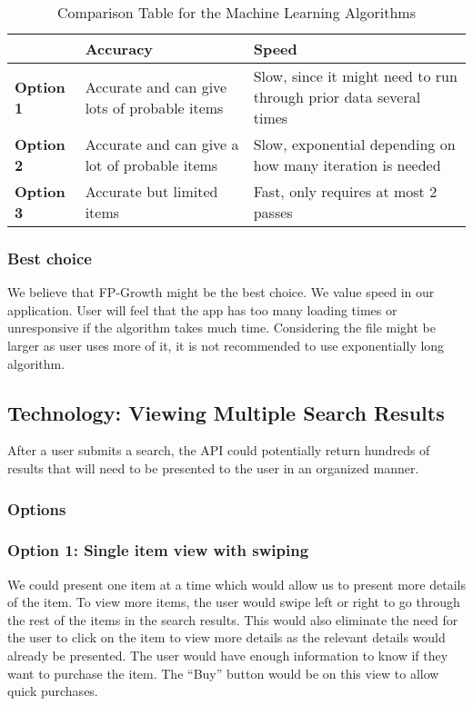 \documentclass[journal,compsoc, 10pt, draftclsnofoot, onecolumn]{IEEEtran}
\begin{document}
\begin{table}[h]
	\centering
	\caption{Comparison Table for the Machine Learning Algorithms}
	\label{Comparison Table for the Machine Learning Algorithms}
	\begin{tabularx}{\textwidth}{|X|X|X|}
		\hline
		\textbf{}         & \textbf{Accuracy}                & \textbf{Speed} 
		\\ \hline
\textbf{Option 1} & Accurate and can give lots of probable items & Slow, since it
might need to run through prior data several times
		\\ \hline
\textbf{Option 2} & Accurate and can give a lot of probable items & Slow, exponential
depending on how many iteration is needed
		\\ \hline
\textbf{Option 3} & Accurate but limited items & Fast, only requires at most 2 passes		\\ \hline
	\end{tabularx}
\end{table}

\subsubsection{Best choice}
We believe that FP-Growth might be the best choice. We value speed in our
application. User will feel that the app has too many loading times or unresponsive
if the algorithm takes much time. Considering the file might be larger as user uses
more of it, it is not recommended to use exponentially long algorithm.

\subsection{Technology: Viewing Multiple Search Results}
After a user submits a search, the API could potentially return hundreds of results
that will need to be presented to the user in an organized manner.

\subsubsection{Options}
\subsubsection*{Option 1: Single item view with swiping}
We could present one item at a time which would allow us to present more details of
the item. To view more items, the user would swipe left or right to go through the 
rest of the items in the search results. This would also eliminate the need for the 
user to click on the item to view more details as the relevant details would already 
be presented. The user would have enough information to know if they want to 
purchase the item. The ``Buy'' button would be on this view to allow quick purchases. 
\end{document}
